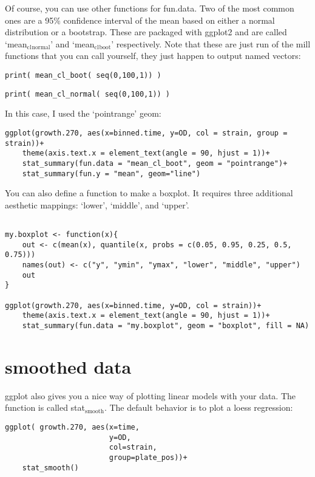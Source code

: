 \documentclass[11pt]{article}
\begin{document}
Of course, you can use other functions for fun.data. Two of the most
common ones are a 95\% confidence interval of the mean based on either
a normal distribution or a bootstrap. These are packaged with ggplot2
and are called `mean$_{\mathrm{cl}}$$_{\mathrm{normal}}$' and `mean$_{\mathrm{cl}}$$_{\mathrm{boot}}$' respectively. Note
that these are just run of the mill functions that you can call
yourself, they just happen to output named vectors:

\begin{verbatim}
print( mean_cl_boot( seq(0,100,1)) )
\end{verbatim}


\begin{verbatim}
print( mean_cl_normal( seq(0,100,1)) )
\end{verbatim}


In this case, I used the `pointrange' geom:

\begin{verbatim}
ggplot(growth.270, aes(x=binned.time, y=OD, col = strain, group = strain))+
    theme(axis.text.x = element_text(angle = 90, hjust = 1))+
    stat_summary(fun.data = "mean_cl_boot", geom = "pointrange")+
    stat_summary(fun.y = "mean", geom="line")
\end{verbatim}


You can also define a function to make a boxplot. It requires three
additional aesthetic mappings: `lower', `middle', and `upper'.

\begin{verbatim}

my.boxplot <- function(x){
    out <- c(mean(x), quantile(x, probs = c(0.05, 0.95, 0.25, 0.5, 0.75)))
    names(out) <- c("y", "ymin", "ymax", "lower", "middle", "upper")
    out
}

ggplot(growth.270, aes(x=binned.time, y=OD, col = strain))+
    theme(axis.text.x = element_text(angle = 90, hjust = 1))+
    stat_summary(fun.data = "my.boxplot", geom = "boxplot", fill = NA)
\end{verbatim}
\section{smoothed data}
\label{sec-3}


ggplot also gives you a nice way of plotting linear models with your
data. The function is called stat$_{\mathrm{smooth}}$. The default behavior is to
plot a loess regression:

\begin{verbatim}
ggplot( growth.270, aes(x=time,
                        y=OD,
                        col=strain,
                        group=plate_pos))+
    stat_smooth()
\end{verbatim}
\end{document}
